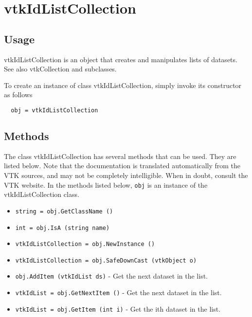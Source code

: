 \section{vtkIdListCollection}

\subsection{Usage}

 vtkIdListCollection is an object that creates and manipulates lists of
 datasets. See also vtkCollection and subclasses.

To create an instance of class vtkIdListCollection, simply
invoke its constructor as follows
\begin{verbatim}
  obj = vtkIdListCollection
\end{verbatim}
\subsection{Methods}

The class vtkIdListCollection has several methods that can be used.
  They are listed below.
Note that the documentation is translated automatically from the VTK sources,
and may not be completely intelligible.  When in doubt, consult the VTK website.
In the methods listed below, \verb|obj| is an instance of the vtkIdListCollection class.
\begin{itemize}
\item  \verb|string = obj.GetClassName ()|

\item  \verb|int = obj.IsA (string name)|

\item  \verb|vtkIdListCollection = obj.NewInstance ()|

\item  \verb|vtkIdListCollection = obj.SafeDownCast (vtkObject o)|

\item  \verb|obj.AddItem (vtkIdList ds)| -  Get the next dataset in the list.

\item  \verb|vtkIdList = obj.GetNextItem ()| -  Get the next dataset in the list.

\item  \verb|vtkIdList = obj.GetItem (int i)| -  Get the ith dataset in the list.

\end{itemize}
